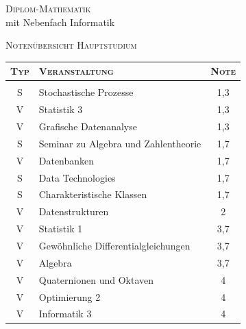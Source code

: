 \documentclass[a4paper,10pt]{article} %
\begin{document}

\newpage

\vspace*{3em}
\par{\centering\Large \hypertarget{grds}{\textsc{Diplom-Mathematik}\\mit Nebenfach Informatik}\par}
\vspace{0.5em}\LARGE{\centering \textsc{Notenübersicht Hauptstudium}\par}\normalsize
\vspace{4em}
\begin{center}\large
\begin{tabular}{clc}
\multicolumn{1}{c}{\textsc{Typ}} & \textsc{Veranstaltung}&\textsc{Note}\\ \hline
\vspace{2pt}\\
S& Stochastische Prozesse& 1,3\\
V& Statistik 3& 1,3\\
V& Grafische Datenanalyse& 1,3\\
S& Seminar zu Algebra und Zahlentheorie& 1,7\\
V& Datenbanken& 1,7\\
S& Data Technologies& 1,7 \\
S& Charakteristische Klassen& 1,7\\
V& Datenstrukturen& 2\\
V& Statistik 1& 3,7\\
V& Gewöhnliche Differentialgleichungen& 3,7\\
V& Algebra& 3,7\\
V& Quaternionen und Oktaven& 4\\
V& Optimierung 2& 4\\
V& Informatik 3& 4\\	
\end{tabular}
\end{center}





\end{document}
